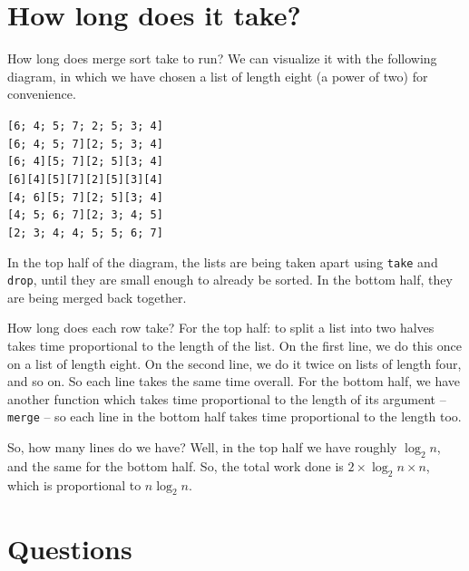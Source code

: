 \documentclass[]{book}
\newcommand{\smspace}{\vspace{4mm}}
\begin{document}
\section*{How long does it take?}

How long does merge sort take to run? We can visualize it with the following diagram, in which we have chosen a list of length eight (a power of two) for convenience.

\smspace
  \noindent\texttt{[6; 4; 5; 7; 2; 5; 3; 4]}\\
  \texttt{[6; 4; 5; 7][2; 5; 3; 4]}\\
  \texttt{[6; 4][5; 7][2; 5][3; 4]}\\
  \texttt{[6][4][5][7][2][5][3][4]}\\
  \texttt{[4; 6][5; 7][2; 5][3; 4]}\\
  \texttt{[4; 5; 6; 7][2; 3; 4; 5]}\\
  \texttt{[2; 3; 4; 4; 5; 5; 6; 7]}
\smspace

\noindent In the top half of the diagram, the lists are being taken apart using \texttt{take} and \texttt{drop}, until they are small enough to already be sorted. In the bottom half, they are being merged back together.

How long does each row take? For the top half: to split a list into two halves takes time proportional to the length of the list. On the first line, we do this once on a list of length eight. On the second line, we do it twice on lists of length four, and so on. So each line takes the same time overall. For the bottom half, we have another function  which takes time proportional to the length of its argument -- \texttt{merge} -- so each line in the bottom half takes time proportional to the length too.

So, how many lines do we have? Well, in the top half we have roughly $\log_{2}n$, and the same for the bottom half. So, the total work done is $2 \times \log_2{n} \times n$, which is proportional to $n \log_{2}n$.

\clearpage
\section*{Questions}
\end{document}
